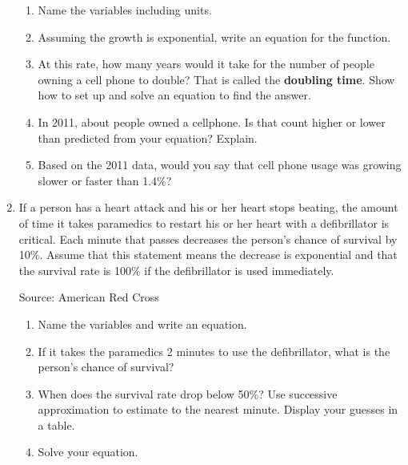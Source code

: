 \begin{enumerate}
\begin{enumerate}
\item Name the variables including units.  \vfill
\item Assuming the growth is exponential, write an equation for the function.  \vfill
\item At this rate, how many years would it take for the number of people owning a cell phone to double?  That is called the  \textbf{doubling time}.  Show how to set up and solve an equation to find the answer.  \vfill   \vfill
\item In 2011, about  people owned a cellphone.  Is that count higher or lower than predicted from your equation?  Explain.  \vfill
\item Based on the 2011 data, would you say that cell phone usage was growing slower or faster than 1.4\%?  \vfill
\end{enumerate}

\newpage %

\item  If a person has a heart attack and his or her heart stops beating, the amount of time it takes paramedics to restart his or her heart with a defibrillator is critical.  Each minute that passes decreases the person's chance of survival by 10\%.  Assume that this statement means the decrease is exponential and that the survival rate is 100\% if the defibrillator is used immediately. \hfill \begin{footnotesize} Source: American Red Cross \end{footnotesize}
\begin{enumerate}
\item Name the variables and write an equation. \vfill
\item If it takes the paramedics 2 minutes to use the defibrillator, what is the person's chance of survival? \vfill
\item When does the survival rate drop below 50\%? Use successive approximation to estimate to the nearest minute.  Display your guesses in a table. \vfill \vfill
\item Solve your equation. \vfill \vfill
\end{enumerate}  

\newpage %


\end{enumerate}
